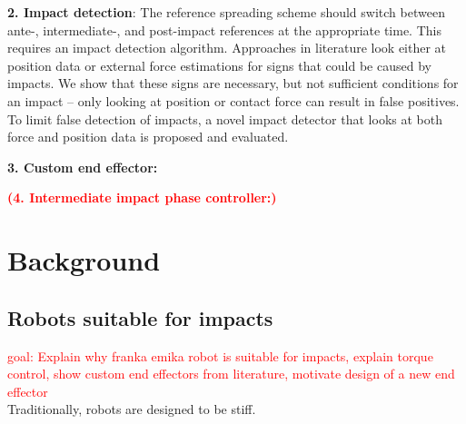 \documentclass[a4paper, 10pt, conference]{ieeeconf}
\begin{document}
    \textbf{2. Impact detection}: The reference spreading scheme should switch between ante-, intermediate-, and post-impact references at the appropriate time. This requires an impact detection algorithm. Approaches in literature look either at position data \cite{rijnenMotionSignalsVelocity2018} or external force estimations \cite{uitendaalTeachingRobotsInteraction2022,properAimAwareCollisionMonitoring2021,properValidationNumericalSimultaneous2022} for signs that could be caused by impacts. We show that these signs are necessary, but not sufficient conditions for an impact -- only looking at position or contact force can result in false positives. To limit false detection of impacts, a novel impact detector that looks at both force and position data is proposed and evaluated.

    \textbf{3. Custom end effector:}

    \textbf{\textcolor{red}{(4. Intermediate impact phase controller:)}}

    \section{Background}
    \subsection{Robots suitable for impacts}
    \textcolor{red}{goal: Explain why franka emika robot is suitable for impacts, explain torque control, show custom end effectors from literature, motivate design of a new end effector}\\
    Traditionally, robots are designed to be stiff. 

\end{document}
